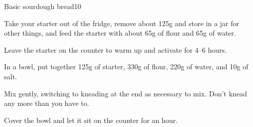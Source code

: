 \documentclass{article}
\begin{document}
  \begin{recipe}{Basic sourdough bread}{10}
    \begin{step}
      \begin{ingrs}
      \end{ingrs}
      \begin{stepdesc}
        Take your starter out of the fridge, remove about 125g and store in a jar for other things, and feed the starter with about 65g of flour and 65g of water.
      \end{stepdesc}
    \end{step}
    \begin{step}
      \begin{ingrs}
      \end{ingrs}
      \begin{stepdesc}
        Leave the starter on the counter to warm up and activate for 4--6 hours.
      \end{stepdesc}
    \end{step}
    \begin{step}
      \begin{ingrs}
      \end{ingrs}
      \begin{stepdesc}
        In a bowl, put together 125g of starter, 330g of flour, 220g of water, and 10g of salt.
      \end{stepdesc}
    \end{step}
    \begin{step}
      \begin{ingrs}
      \end{ingrs}
      \begin{stepdesc}
        Mix gently, switching to kneading at the end as necessary to mix. Don't knead any more than you have to.
      \end{stepdesc}
    \end{step}
    \begin{step}
      \begin{ingrs}
      \end{ingrs}
      \begin{stepdesc}
        Cover the bowl and let it sit on the counter for an hour.
      \end{stepdesc}

\end{step}
\end{recipe}
\end{document}
